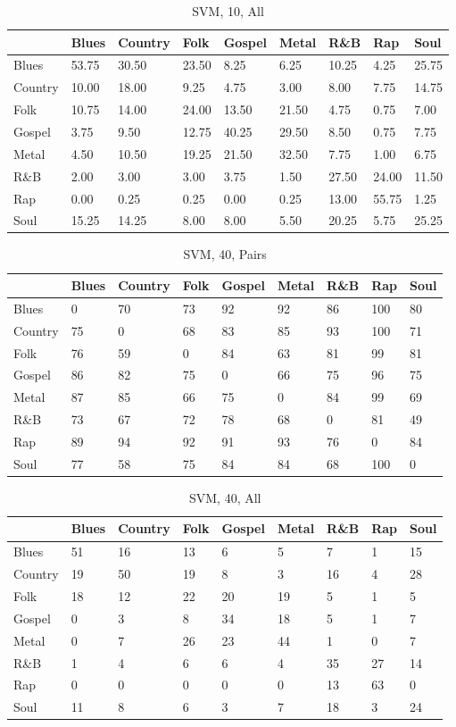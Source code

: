 \documentclass[a4paper,oneside]{article}
\begin{document}
\begin{table}[H]\centering
\caption{SVM, 10, All}
\begin{tabu}{l|*{8}{l}}
 & Blues & Country & Folk & Gospel & Metal & R\&B & Rap & Soul \\ \hline
Blues & 53.75 & 30.50 & 23.50 & 8.25 & 6.25 & 10.25 & 4.25 & 25.75 \\
Country & 10.00 & 18.00 & 9.25 & 4.75 & 3.00 & 8.00 & 7.75 & 14.75 \\
Folk & 10.75 & 14.00 & 24.00 & 13.50 & 21.50 & 4.75 & 0.75 & 7.00 \\
Gospel & 3.75 & 9.50 & 12.75 & 40.25 & 29.50 & 8.50 & 0.75 & 7.75 \\
Metal & 4.50 & 10.50 & 19.25 & 21.50 & 32.50 & 7.75 & 1.00 & 6.75 \\
R\&B & 2.00 & 3.00 & 3.00 & 3.75 & 1.50 & 27.50 & 24.00 & 11.50 \\
Rap & 0.00 & 0.25 & 0.25 & 0.00 & 0.25 & 13.00 & 55.75 & 1.25 \\
Soul & 15.25 & 14.25 & 8.00 & 8.00 & 5.50 & 20.25 & 5.75 & 25.25 \\
\end{tabu}
\end{table}

\begin{table}[H]\centering
\caption{SVM, 40, Pairs}
\begin{tabu}{l|*{8}{l}}
 & Blues & Country & Folk & Gospel & Metal & R\&B & Rap & Soul \\ \hline
Blues & 0 & 70 & 73 & 92 & 92 & 86 & 100 & 80 \\
Country & 75 & 0 & 68 & 83 & 85 & 93 & 100 & 71 \\
Folk & 76 & 59 & 0 & 84 & 63 & 81 & 99 & 81 \\
Gospel & 86 & 82 & 75 & 0 & 66 & 75 & 96 & 75 \\
Metal & 87 & 85 & 66 & 75 & 0 & 84 & 99 & 69 \\
R\&B & 73 & 67 & 72 & 78 & 68 & 0 & 81 & 49 \\
Rap & 89 & 94 & 92 & 91 & 93 & 76 & 0 & 84 \\
Soul & 77 & 58 & 75 & 84 & 84 & 68 & 100 & 0
\end{tabu}
\end{table}

\begin{table}[H]\centering
\caption{SVM, 40, All}
\begin{tabu}{l|*{8}{l}}
 & Blues & Country & Folk & Gospel & Metal & R\&B & Rap & Soul \\ \hline
Blues & 51 & 16 & 13 & 6 & 5 & 7 & 1 & 15 \\
Country & 19 & 50 & 19 & 8 & 3 & 16 & 4 & 28 \\
Folk & 18 & 12 & 22 & 20 & 19 & 5 & 1 & 5 \\
Gospel & 0 & 3 & 8 & 34 & 18 & 5 & 1 & 7 \\
Metal & 0 & 7 & 26 & 23 & 44 & 1 & 0 & 7 \\
R\&B & 1 & 4 & 6 & 6 & 4 & 35 & 27 & 14 \\
Rap & 0 & 0 & 0 & 0 & 0 & 13 & 63 & 0 \\
Soul & 11 & 8 & 6 & 3 & 7 & 18 & 3 & 24 \\
\end{tabu}
\end{table}
\end{document}
